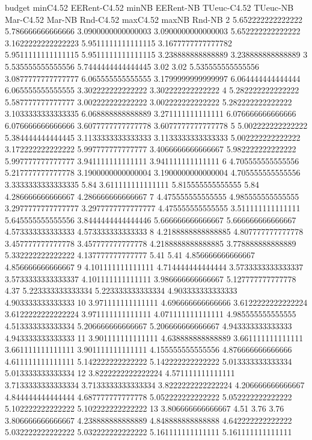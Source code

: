 budget minC4.52 EERent-C4.52 minNB EERent-NB TUeuc-C4.52 TUeuc-NB Mar-C4.52 Mar-NB Rnd-C4.52 maxC4.52 maxNB Rnd-NB
2 5.652222222222222 5.786666666666666 3.0900000000000003 3.0900000000000003 5.652222222222222 3.1622222222222223 5.9511111111111115 3.1677777777777782 5.9511111111111115 5.9511111111111115 3.238888888888889 3.238888888888889
3 5.535555555555556 5.7444444444444445 3.02 3.02 5.535555555555556 3.0877777777777777 6.065555555555555 3.1799999999999997 6.064444444444444 6.065555555555555 3.302222222222222 3.302222222222222
4 5.282222222222222 5.587777777777777 3.002222222222222 3.002222222222222 5.282222222222222 3.1033333333333335 6.068888888888889 3.271111111111111 6.076666666666666 6.076666666666666 3.6077777777777778 3.6077777777777778
5 5.002222222222222 5.384444444444445 3.1133333333333333 3.1133333333333333 5.002222222222222 3.172222222222222 5.997777777777777 3.4066666666666667 5.982222222222222 5.997777777777777 3.941111111111111 3.941111111111111
6 4.705555555555556 5.217777777777778 3.1900000000000004 3.1900000000000004 4.705555555555556 3.3333333333333335 5.84 3.611111111111111 5.815555555555555 5.84 4.286666666666667 4.286666666666667
7 4.475555555555555 4.985555555555555 3.2977777777777777 3.2977777777777777 4.475555555555555 3.511111111111111 5.645555555555556 3.8444444444444446 5.666666666666667 5.666666666666667 4.573333333333333 4.573333333333333
8 4.2188888888888885 4.807777777777778 3.457777777777778 3.457777777777778 4.2188888888888885 3.778888888888889 5.332222222222222 4.137777777777777 5.41 5.41 4.856666666666667 4.856666666666667
9 4.101111111111111 4.714444444444444 3.5733333333333337 3.5733333333333337 4.101111111111111 3.986666666666667 5.127777777777778 4.37 5.223333333333334 5.223333333333334 4.903333333333333 4.903333333333333
10 3.971111111111111 4.696666666666666 3.6122222222222224 3.6122222222222224 3.971111111111111 4.071111111111111 4.985555555555555 4.513333333333334 5.206666666666667 5.206666666666667 4.943333333333333 4.943333333333333
11 3.901111111111111 4.638888888888889 3.661111111111111 3.661111111111111 3.901111111111111 4.155555555555556 4.876666666666666 4.611111111111111 5.142222222222222 5.142222222222222 5.013333333333334 5.013333333333334
12 3.8222222222222224 4.571111111111111 3.7133333333333334 3.7133333333333334 3.8222222222222224 4.206666666666667 4.844444444444444 4.687777777777778 5.052222222222222 5.052222222222222 5.102222222222222 5.102222222222222
13 3.806666666666667 4.51 3.76 3.76 3.806666666666667 4.238888888888889 4.848888888888888 4.642222222222222 5.032222222222222 5.032222222222222 5.161111111111111 5.161111111111111
